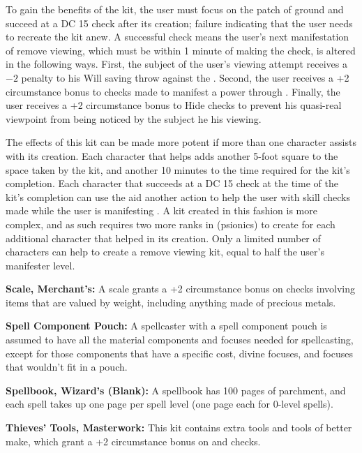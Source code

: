To gain the benefits of the kit, the user must focus on the  patch of ground and succeed at a DC 15   check after its creation; failure indicating that the user needs  to recreate the kit anew. A successful check means the user's  next manifestation of remove viewing, which must be within  1 minute of making the check, is altered in the following  ways. First, the subject of the user's viewing attempt  receives a $-2$ penalty to his Will saving throw against the  . Second, the user receives a +2 circumstance  bonus to  checks made to manifest a power  through . Finally, the user receives a +2  circumstance bonus to Hide checks to prevent his quasi-real  viewpoint from being noticed by the subject he his viewing.

The effects of this kit can be made more potent if more  than one character assists with its creation. Each character  that helps adds another 5-foot square to the space taken by  the kit, and another 10 minutes to the time required for the  kit's completion. Each character that succeeds at a DC 15   check at the time of the kit's completion can  use the aid another action to help the user with skill checks  made while the user is manifesting . A kit  created in this fashion is more complex, and as such  requires two more ranks in  (psionics) to create  for each additional character that helped in its creation.  Only a limited number of characters can help to create a  remove viewing kit, equal to half the user's manifester level.

\textbf{Scale, Merchant's:} A scale grants a +2 circumstance bonus on  checks involving items that are valued by weight, including anything made of precious metals.

\textbf{Spell Component Pouch:} A spellcaster with a spell component pouch is assumed to have all the material components and focuses needed for spellcasting, except for those components that have a specific cost, divine focuses, and focuses that wouldn't fit in a pouch.

\textbf{Spellbook, Wizard's (Blank):} A spellbook has 100 pages of parchment, and each spell takes up one page per spell level (one page each for 0-level spells).

\textbf{Thieves' Tools, Masterwork:} This kit contains extra tools and tools of better make, which grant a +2 circumstance bonus on  and  checks.

